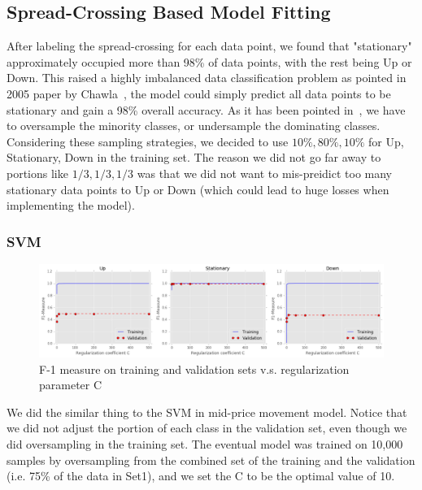 \documentclass[11pt]{article}
\begin{document}
\subsection{Spread-Crossing Based Model Fitting}
After labeling the spread-crossing for each data point, we found that "stationary" approximately occupied more than 98\% of data points, with the rest being Up or Down. This raised a highly imbalanced data classification problem as pointed in 2005 paper by Chawla~\cite{imbalance}, the model could simply predict all data points to be stationary and gain a 98\% overall accuracy. As it has been pointed in~\cite{imbalance}, we have to oversample the minority classes, or undersample the dominating classes. Considering these sampling strategies, we decided to use ${10\%,80\%,10\%}$ for {Up, Stationary, Down} in the training set. The reason we did not go far away to portions like ${1/3,1/3,1/3}$ was that we did not want to mis-preidict too many stationary data points to Up or Down (which could lead to huge losses when implementing the model).
\subsubsection{SVM}
\begin{figure}[H]
\centering
\includegraphics [width=.9\linewidth,height=0.22\linewidth]{./figures/svm_cross_f1.png}
\caption{F-1 measure on training and validation sets v.s. regularization parameter C}
\label{fig:cross_f1}
\end{figure}
We did the similar thing to the SVM in mid-price movement model. Notice that we did not adjust the portion of each class in the validation set, even though we did oversampling in the training set. The eventual model was trained on 10,000 samples by oversampling from the combined set of the training and the validation (i.e. 75\% of the data in Set1), and we set the C to be the optimal value of 10.
\end{document}
